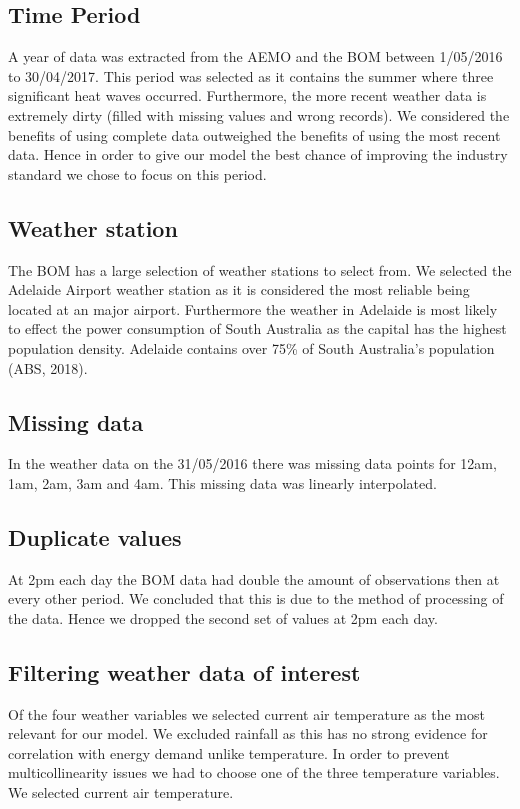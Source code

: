 \documentclass[11pt]{article}
\begin{document}
\subsection{Time Period} 
A year of data  was extracted  from the AEMO and the BOM between 1/05/2016 to 30/04/2017. This period was selected as it contains the summer where three significant heat waves occurred. Furthermore, the more recent weather data is extremely dirty (filled with missing values and wrong records). We considered the benefits of using complete data outweighed the benefits of using the most recent data. Hence in order to give our model the best chance of improving the industry standard we chose to focus on this period. 
 
\subsection{Weather station} 
The BOM has a large selection of weather stations to select from. We selected the Adelaide Airport weather station as it is considered the most reliable being located at an major airport. Furthermore the weather in Adelaide is most likely to effect the power consumption of South Australia as the capital has the highest population density. Adelaide contains over 75\% of South Australia's population (ABS, 2018).

\subsection{Missing data} 
In the weather data on the 31/05/2016 there was missing data points for 12am, 1am, 2am, 3am and 4am. This missing data was linearly interpolated. 

\subsection{Duplicate values} 
At 2pm each day the BOM data had double the amount of observations then at every other period. We concluded that this is due to the method of processing of the data. Hence we dropped the second set of values at 2pm each day.

\subsection{Filtering weather data of interest}
Of the four weather variables we selected current air temperature as the most relevant for our model. We excluded rainfall as this has no strong evidence for correlation with energy demand unlike temperature. In order to prevent multicollinearity issues we had to choose one of the three temperature variables. We selected current air temperature.
\end{document}
